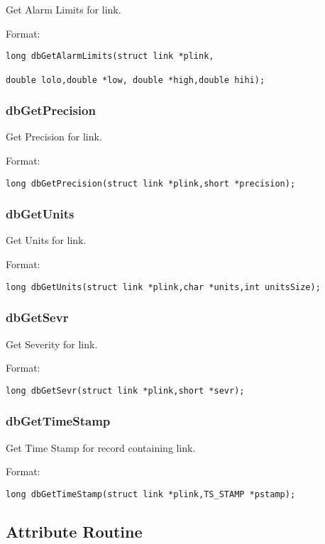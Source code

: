 Get Alarm Limits for link.

Format:

\begin{verbatim}long dbGetAlarmLimits(struct link *plink,

double lolo,double *low, double *high,double hihi);
\end{verbatim}\subsubsection{dbGetPrecision}

Get Precision for link.

Format:

\begin{verbatim}long dbGetPrecision(struct link *plink,short *precision);
\end{verbatim}\subsubsection{dbGetUnits}

Get Units for link.

Format:

\begin{verbatim}long dbGetUnits(struct link *plink,char *units,int unitsSize);
\end{verbatim}\subsubsection{dbGetSevr}

Get Severity for link.

Format:

\begin{verbatim}long dbGetSevr(struct link *plink,short *sevr);
\end{verbatim}\subsubsection{dbGetTimeStamp}

Get Time Stamp for record containing link.

Format:

\begin{verbatim}long dbGetTimeStamp(struct link *plink,TS_STAMP *pstamp);
\end{verbatim}\subsection{Attribute Routine}

